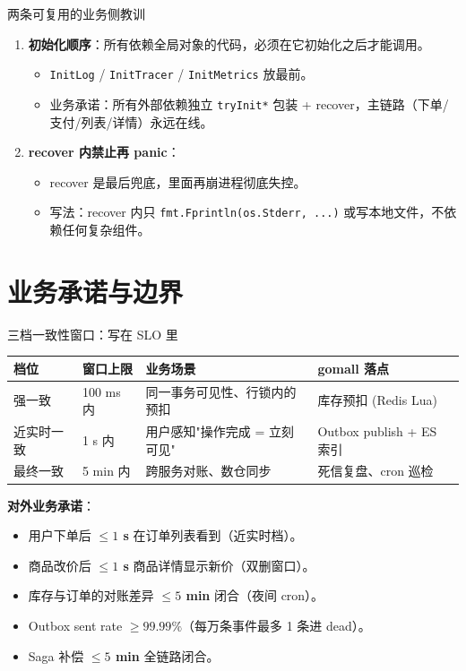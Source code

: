 \documentclass[aspectratio=169,11pt]{beamer}
\begin{document}
\begin{frame}[shrink]{两条可复用的业务侧教训}
\begin{enumerate}
  \item \textbf{初始化顺序}：所有依赖全局对象的代码，必须在它初始化之后才能调用。
  \begin{itemize}
    \item \texttt{InitLog} / \texttt{InitTracer} / \texttt{InitMetrics} 放最前。
    \item 业务承诺：所有外部依赖独立 \texttt{tryInit*} 包装 + recover，主链路（下单/支付/列表/详情）永远在线。
  \end{itemize}
  \item \textbf{recover 内禁止再 panic}：
  \begin{itemize}
    \item recover 是最后兜底，里面再崩进程彻底失控。
    \item 写法：recover 内只 \texttt{fmt.Fprintln(os.Stderr, ...)} 或写本地文件，不依赖任何复杂组件。
  \end{itemize}
\end{enumerate}
\end{frame}

\section{业务承诺与边界}

\begin{frame}[shrink]{三档一致性窗口：写在 SLO 里}
\noindent\begin{tabular}{@{}lp{2.4cm}p{4.2cm}p{2.8cm}@{}}
\toprule
档位 & 窗口上限 & 业务场景 & gomall 落点 \\
\midrule
强一致         & 100 ms 内      & 同一事务可见性、行锁内的预扣 & 库存预扣 (Redis Lua) \\
近实时一致     & 1 s 内         & 用户感知"操作完成 = 立刻可见" & Outbox publish + ES 索引 \\
最终一致       & 5 min 内       & 跨服务对账、数仓同步         & 死信复盘、cron 巡检 \\
\bottomrule
\end{tabular}\par
\vspace{2mm}
{\small \textbf{对外业务承诺}：
\begin{itemize}
  \item 用户下单后 \textbf{$\leq 1$ s} 在订单列表看到（近实时档）。
  \item 商品改价后 \textbf{$\leq 1$ s} 商品详情显示新价（双删窗口）。
  \item 库存与订单的对账差异 \textbf{$\leq 5$ min} 闭合（夜间 cron）。
  \item Outbox sent rate \textbf{$\geq 99.99\%$}（每万条事件最多 1 条进 dead）。
  \item Saga 补偿 \textbf{$\leq 5$ min} 全链路闭合。
\end{itemize}}
\end{frame}
\end{document}
